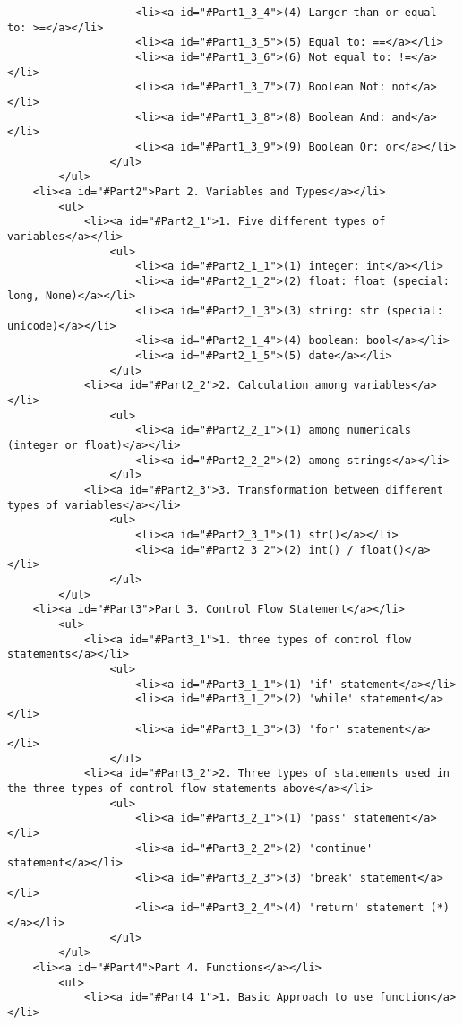 \documentclass[11pt]{article}
\begin{document}
\begin{verbatim}
                    <li><a id="#Part1_3_4">(4) Larger than or equal to: >=</a></li>
                    <li><a id="#Part1_3_5">(5) Equal to: ==</a></li>
                    <li><a id="#Part1_3_6">(6) Not equal to: !=</a></li>
                    <li><a id="#Part1_3_7">(7) Boolean Not: not</a></li>
                    <li><a id="#Part1_3_8">(8) Boolean And: and</a></li>
                    <li><a id="#Part1_3_9">(9) Boolean Or: or</a></li>
                </ul>
        </ul>
    <li><a id="#Part2">Part 2. Variables and Types</a></li>
        <ul>
            <li><a id="#Part2_1">1. Five different types of variables</a></li>
                <ul>
                    <li><a id="#Part2_1_1">(1) integer: int</a></li>
                    <li><a id="#Part2_1_2">(2) float: float (special: long, None)</a></li>
                    <li><a id="#Part2_1_3">(3) string: str (special: unicode)</a></li>
                    <li><a id="#Part2_1_4">(4) boolean: bool</a></li>
                    <li><a id="#Part2_1_5">(5) date</a></li>
                </ul>
            <li><a id="#Part2_2">2. Calculation among variables</a></li>
                <ul>
                    <li><a id="#Part2_2_1">(1) among numericals (integer or float)</a></li>
                    <li><a id="#Part2_2_2">(2) among strings</a></li>
                </ul>
            <li><a id="#Part2_3">3. Transformation between different types of variables</a></li>
                <ul>
                    <li><a id="#Part2_3_1">(1) str()</a></li>
                    <li><a id="#Part2_3_2">(2) int() / float()</a></li>
                </ul>
        </ul>
    <li><a id="#Part3">Part 3. Control Flow Statement</a></li>   
        <ul>
            <li><a id="#Part3_1">1. three types of control flow statements</a></li>
                <ul>
                    <li><a id="#Part3_1_1">(1) 'if' statement</a></li>
                    <li><a id="#Part3_1_2">(2) 'while' statement</a></li>
                    <li><a id="#Part3_1_3">(3) 'for' statement</a></li>
                </ul>
            <li><a id="#Part3_2">2. Three types of statements used in the three types of control flow statements above</a></li>
                <ul>
                    <li><a id="#Part3_2_1">(1) 'pass' statement</a></li>
                    <li><a id="#Part3_2_2">(2) 'continue' statement</a></li>
                    <li><a id="#Part3_2_3">(3) 'break' statement</a></li>
                    <li><a id="#Part3_2_4">(4) 'return' statement (*)</a></li>
                </ul>
        </ul>
    <li><a id="#Part4">Part 4. Functions</a></li>   
        <ul>
            <li><a id="#Part4_1">1. Basic Approach to use function</a></li>

\end{verbatim}
\end{document}
